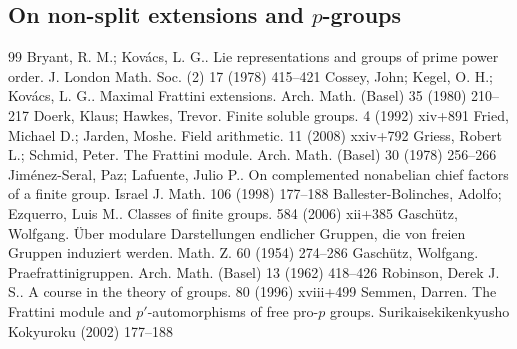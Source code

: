 \documentclass[10pt,a4paper]{amsart}
\begin{document}
\subsection{On non-split extensions and $p$-groups}\label{pgruppi}


\begin{thebibliography}{99}
 Bryant, R. M.; Kov\'acs, L. G.. Lie representations and groups of prime power order. J. London Math. Soc. (2) 17 (1978) 415--421
 Cossey, John; Kegel, O. H.; Kov\'acs, L. G.. Maximal {F}rattini extensions. Arch. Math. (Basel) 35 (1980) 210--217
 Doerk, Klaus; Hawkes, Trevor. Finite soluble groups. 4 (1992) xiv+891
 Fried, Michael D.; Jarden, Moshe. Field arithmetic. 11 (2008) xxiv+792
 Griess, Robert L.; Schmid, Peter. The {F}rattini module. Arch. Math. (Basel) 30 (1978) 256--266
 Jim\'{e}nez-Seral, Paz; Lafuente, Julio P.. On complemented nonabelian chief factors of a finite group. Israel J. Math. 106 (1998) 177--188
 Ballester-Bolinches, Adolfo; Ezquerro, Luis M.. Classes of finite groups. 584 (2006) xii+385
 Gasch\"{u}tz, Wolfgang. \"{U}ber modulare {D}arstellungen endlicher {G}ruppen, die von freien {G}ruppen induziert werden. Math. Z. 60 (1954) 274--286
 Gasch\"{u}tz, Wolfgang. Praefrattinigruppen. Arch. Math. (Basel) 13 (1962) 418--426
 Robinson, Derek J. S.. A course in the theory of groups. 80 (1996) xviii+499
 Semmen, Darren. The {F}rattini module and {$p'$}-automorphisms of free pro-{$p$} groups. Surikaisekikenkyusho Kokyuroku (2002) 177--188
\end{thebibliography}
\end{document}
